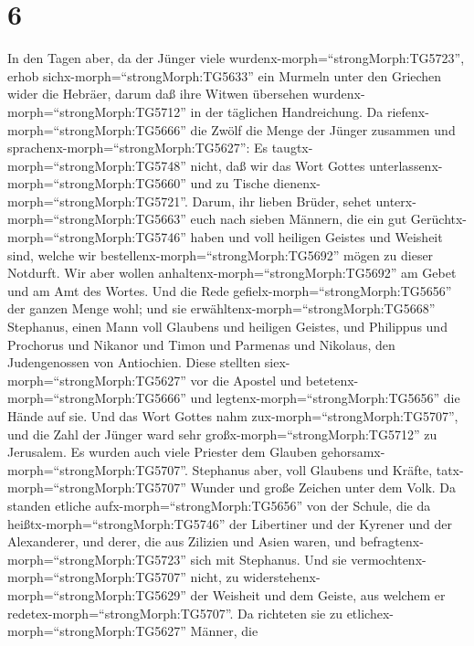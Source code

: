 \hypertarget{section-5}{%
\section{6}\label{section-5}}

 In den Tagen aber, da der Jünger viele
wurdenx-morph=``strongMorph:TG5723'', erhob
sichx-morph=``strongMorph:TG5633'' ein Murmeln unter den Griechen wider
die Hebräer, darum daß ihre Witwen übersehen
wurdenx-morph=``strongMorph:TG5712'' in der täglichen Handreichung.
 Da riefenx-morph=``strongMorph:TG5666'' die Zwölf die Menge
der Jünger zusammen und sprachenx-morph=``strongMorph:TG5627'': Es
taugtx-morph=``strongMorph:TG5748'' nicht, daß wir das Wort Gottes
unterlassenx-morph=``strongMorph:TG5660'' und zu Tische
dienenx-morph=``strongMorph:TG5721''.  Darum, ihr lieben
Brüder, sehet unterx-morph=``strongMorph:TG5663'' euch nach sieben
Männern, die ein gut Gerüchtx-morph=``strongMorph:TG5746'' haben und
voll heiligen Geistes und Weisheit sind, welche wir
bestellenx-morph=``strongMorph:TG5692'' mögen zu dieser Notdurft.
 Wir aber wollen anhaltenx-morph=``strongMorph:TG5692'' am
Gebet und am Amt des Wortes.  Und die Rede
gefielx-morph=``strongMorph:TG5656'' der ganzen Menge wohl; und sie
erwähltenx-morph=``strongMorph:TG5668'' Stephanus, einen Mann voll
Glaubens und heiligen Geistes, und Philippus und Prochorus und Nikanor
und Timon und Parmenas und Nikolaus, den Judengenossen von Antiochien.
 Diese stellten siex-morph=``strongMorph:TG5627'' vor die
Apostel und betetenx-morph=``strongMorph:TG5666'' und
legtenx-morph=``strongMorph:TG5656'' die Hände auf sie.  Und
das Wort Gottes nahm zux-morph=``strongMorph:TG5707'', und die Zahl der
Jünger ward sehr großx-morph=``strongMorph:TG5712'' zu Jerusalem. Es
wurden auch viele Priester dem Glauben
gehorsamx-morph=``strongMorph:TG5707''.  Stephanus aber,
voll Glaubens und Kräfte, tatx-morph=``strongMorph:TG5707'' Wunder und
große Zeichen unter dem Volk.  Da standen etliche
aufx-morph=``strongMorph:TG5656'' von der Schule, die da
heißtx-morph=``strongMorph:TG5746'' der Libertiner und der Kyrener und
der Alexanderer, und derer, die aus Zilizien und Asien waren, und
befragtenx-morph=``strongMorph:TG5723'' sich mit Stephanus.
 Und sie vermochtenx-morph=``strongMorph:TG5707'' nicht, zu
widerstehenx-morph=``strongMorph:TG5629'' der Weisheit und dem Geiste,
aus welchem er redetex-morph=``strongMorph:TG5707''.  Da
richteten sie zu etlichex-morph=``strongMorph:TG5627'' Männer, die
